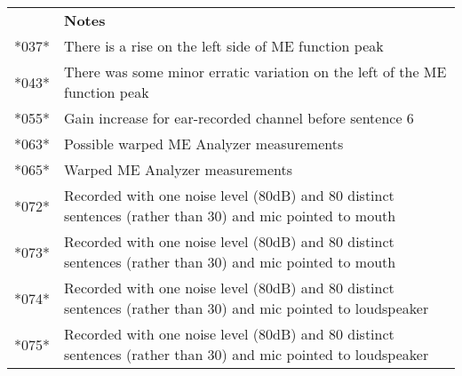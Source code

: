 \begin{center}
\begin{tabular}{c|p{12cm}}
      & \textbf{Notes} \\
*037* & There is a rise on the left side of ME function peak \\
*043* & There was some minor erratic variation on the left of the ME function peak \\
*055* & Gain increase for ear-recorded channel before sentence 6 \\
*063* & Possible warped ME Analyzer measurements \\
*065* & Warped ME Analyzer measurements \\
*072* & Recorded with one noise level (80dB) and 80 distinct sentences (rather than 30) and mic pointed to mouth \\
*073* & Recorded with one noise level (80dB) and 80 distinct sentences (rather than 30) and mic pointed to mouth \\
*074* & Recorded with one noise level (80dB) and 80 distinct sentences (rather than 30) and mic pointed to loudspeaker \\
*075* & Recorded with one noise level (80dB) and 80 distinct sentences (rather than 30) and mic pointed to loudspeaker \\
\end{tabular}
\end{center}


% 
% 
% 
% 
